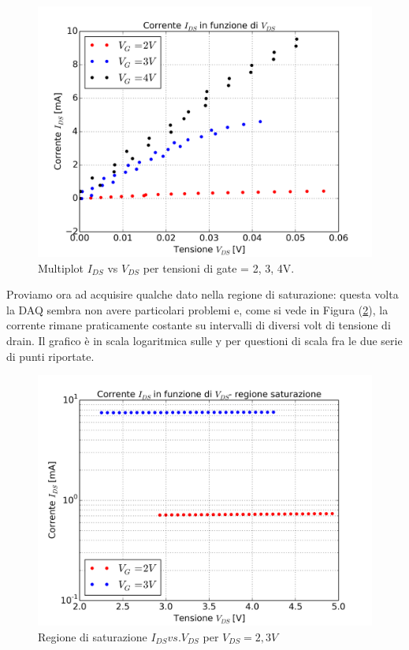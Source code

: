 \documentclass[journal, a4paper]{IEEEtran}
\begin{document}
\begin{figure}
\centering
\includegraphics[width=0.9\linewidth]{./es9_multivg}
\caption{Multiplot $I_{DS}$ vs $V_{DS}$ per tensioni di gate = 2, 3, 4V.}
\label{fig:es9_multivg}
\end{figure}

Proviamo ora ad acquisire qualche dato nella regione di saturazione: questa volta la DAQ sembra non avere particolari problemi e, come si vede in Figura (\ref{fig:es11_multivg}), la corrente rimane praticamente costante su intervalli di diversi volt di tensione di drain. Il grafico è in scala logaritmica sulle y per questioni di scala fra le due serie di punti riportate. \\

\begin{figure}
\centering
\includegraphics[width=0.9\linewidth]{./es11_multivg}
\caption{Regione di saturazione $I_{DS} vs. V_{DS}$ per $V_{DS} = 2, 3 V$}
\label{fig:es11_multivg}
\end{figure}
\end{document}
